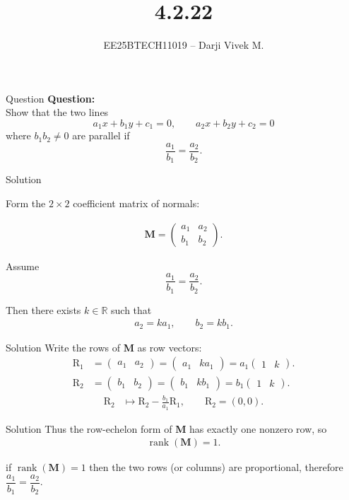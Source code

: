 \documentclass{beamer}
\title{4.2.22}
\author{EE25BTECH11019 -- Darji Vivek M.}
\date{}
\newcommand{\myvec}[1]{\begin{pmatrix}#1\end{pmatrix}}
\renewcommand{\vec}[1]{\mathbf{#1}}
\begin{document}
\begin{frame}
\begin{titlepage}

\end{titlepage}
\end{frame}

\begin{frame}{Question}
\textbf{Question:}\\
Show that the two lines
\[
a_1 x + b_1 y + c_1 = 0,\qquad a_2 x + b_2 y + c_2 = 0
\]
where $b_1 b_2 \neq 0$ are parallel if 
\[
\frac{a_1}{b_1}=\frac{a_2}{b_2}.
\]
\end{frame}


\begin{frame}{Solution}

Form the $2\times2$ coefficient matrix of normals:

\begin{align}
\vec{M} = \myvec{a_1 & a_2 \\ b_1 & b_2}.
\end{align}

Assume 
\[
\dfrac{a_1}{b_1}=\dfrac{a_2}{b_2}.
\]

Then there exists \(k \in \mathbb{R}\) such that
\begin{align}
a_2 = k a_1, 
\qquad 
b_2 = k b_1.
\end{align}
\end{frame}


\begin{frame}{Solution}
Write the rows of \textbf{M} as row vectors:
\begin{align}
\text{R}_1 &= \myvec{a_1 & a_2} = \myvec{a_1 & k a_1} = a_1\myvec{1 & k}.\\
\text{R}_2 &= \myvec{b_1 & b_2} = \myvec{b_1 & k b_1} = b_1\myvec{1 & k}.
\end{align}
\begin{align}
\text{R}_2 &\mapsto \text{R}_2 - \frac{b_1}{a_1}\text{R}_1 ,\qquad \text{R}_2 = (0,0).
\end{align}

\end{frame}


\begin{frame}{Solution}
Thus the row-echelon form of \textbf{M} has exactly one nonzero row, so
\begin{align}
\operatorname{rank}(\vec{M})=1.
\end{align}

if \(\operatorname{rank}(\vec{M})=1\) then the two rows (or columns) are proportional, therefore \(\dfrac{a_1}{b_1}=\dfrac{a_2}{b_2}\).
\end{frame}
\end{document}
